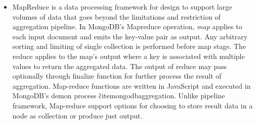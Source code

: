 \begin{itemize}
		   \begin{lstlisting}[language=JSON,caption=Example Aggregation pipeline of XMark Query 12, label=mongodb-aggregation-pipeline][H]
            db.open_auctions.aggregate([
                {$match:{reserve:{$exists:true}}},
		       {$project:{_id:0,reserve:{$multiply:["$reserve",2.20371]}}}
		       ]);
		  \end{lstlisting}
MongoDB's pipeline aggregation consists of many limitations including data types, memory restriction to operators and output size~\cite{nosql/comparision}. 
		  
		  \item MapReduce is a data processing framework for design to support large volumes of data that goes beyond the limitations and restriction of aggregation pipeline.  In MongoDB's Mapreduce operation,  \textit{map} applies to each input document and emits the key-value pair as output. Any arbitrary sorting and limiting  of single collection is performed before map stage. The reduce applies to the map's output  where a key is associated with multiple values to return the aggregated data.  The output of reduce may pass optionally through finalize function for further process the result of aggregation. Map-reduce functions are written in JavaScript and executed in MongoDB's demon process \~cite{mongodbaggregation}.  Unlike pipeline framework, Map-reduce support options for choosing to store result  data in a node as collection or  produce just output. 
		  
\end{itemize}		

